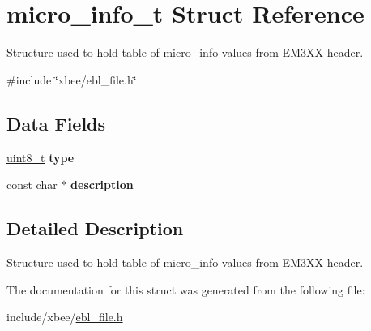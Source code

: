 \hypertarget{structmicro__info__t}{\section{micro\-\_\-info\-\_\-t Struct Reference}
\label{structmicro__info__t}
}


Structure used to hold table of micro\-\_\-info values from E\-M3\-X\-X header.  




{\ttfamily \#include \char`\"{}xbee/ebl\-\_\-file.\-h\char`\"{}}

\subsection*{Data Fields}
\begin{DoxyCompactItemize}
\item 
\hypertarget{structmicro__info__t_a1d127017fb298b889f4ba24752d08b8e}{\hyperlink{group__hal_gae1affc9ca37cfb624959c866a73f83c2}{uint8\-\_\-t} {\bfseries type}}\label{structmicro__info__t_a1d127017fb298b889f4ba24752d08b8e}

\item 
\hypertarget{structmicro__info__t_a68344fa88cf4e86b5079fd69a5c22d57}{const char $\ast$ {\bfseries description}}\label{structmicro__info__t_a68344fa88cf4e86b5079fd69a5c22d57}

\end{DoxyCompactItemize}


\subsection{Detailed Description}
Structure used to hold table of micro\-\_\-info values from E\-M3\-X\-X header. 

The documentation for this struct was generated from the following file\-:\begin{DoxyCompactItemize}
\item 
include/xbee/\hyperlink{ebl__file_8h}{ebl\-\_\-file.\-h}\end{DoxyCompactItemize}
